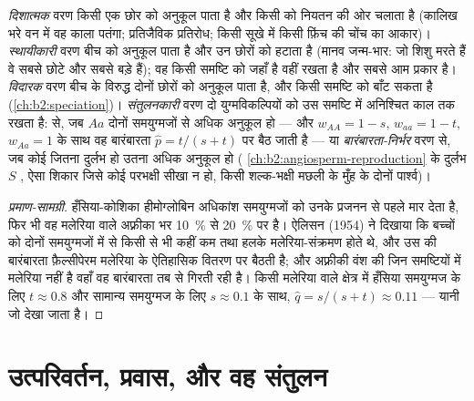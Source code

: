 \begin{proposition}[वरण के प्रकार]\label{prop:b2:population-genetics:kinds}
\emph{दिशात्मक} वरण किसी एक छोर को अनुकूल पाता है और किसी
 को नियतन की ओर चलाता है (कालिख भरे वन में वह काला पतंगा; प्रतिजैविक
प्रतिरोध; किसी सूखे में किसी फ़िंच की चोंच का आकार)।
\emph{स्थायीकारी} वरण बीच को अनुकूल पाता है और उन
छोरों को हटाता है (मानव जन्म-भार: जो शिशु मरते हैं वे सबसे छोटे
और सबसे बड़े हैं); वह किसी समष्टि को जहाँ है वहीं रखता है और सबसे आम प्रकार है।
\emph{विदारक} वरण बीच के विरुद्ध दोनों छोरों को अनुकूल पाता है,
और किसी समष्टि को बाँट सकता है
(\cref{ch:b2:speciation})। \emph{संतुलनकारी} वरण दो
युग्मविकल्पियों को उस समष्टि में अनिश्चित काल तक रखता है: \emph{} से, जब $Aa$ दोनों समयुग्मजों से अधिक अनुकूल हो --- और
$w_{AA} = 1 - s$, $w_{aa} = 1 - t$, $w_{Aa} = 1$ के साथ वह बारंबारता
$\hat p = t/(s + t)$ पर बैठ जाती है --- या \emph{बारंबारता-निर्भर}
वरण से, जब कोई  जितना दुर्लभ हो उतना अधिक अनुकूल हो (
\cref{ch:b2:angiosperm-reproduction} के दुर्लभ $S$ , ऐसा शिकार
जिसे कोई परभक्षी सीखा न हो, किसी शल्क-भक्षी मछली के मुँह के दोनों पार्श्व)।
\end{proposition}
\begin{proof}[प्रमाण-सामग्री]
हँसिया-कोशिका हीमोग्लोबिन अधिकांश समयुग्मजों को उनके प्रजनन से पहले मार
देता है, फिर भी वह  मलेरिया वाले अफ़्रीका भर
\qty{10}{\%} से \qty{20}{\%} पर है। ऐलिसन (1954) ने दिखाया कि  बच्चों को
दोनों समयुग्मजों में से किसी से भी कहीं कम तथा हलके मलेरिया-संक्रमण होते
थे, और उस  की बारंबारता फ़ैल्सीपेरम मलेरिया के ऐतिहासिक
वितरण पर बैठती है; और अफ़्रीकी वंश की जिन समष्टियों में
मलेरिया नहीं है वहाँ वह बारंबारता तब से गिरती रही है। किसी मलेरिया वाले क्षेत्र में
हँसिया समयुग्मज के लिए $t \approx 0.8$ और सामान्य समयुग्मज के लिए $s \approx 0.1$ के साथ,
$\hat q = s/(s + t) \approx 0.11$ --- यानी जो देखा जाता है।
\end{proof}

\section{उत्परिवर्तन, प्रवास, और वह संतुलन}

